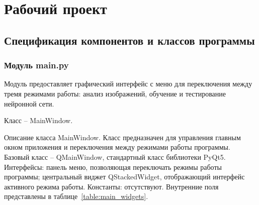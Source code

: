 \section{Рабочий проект}

\subsection{Спецификация компонентов и классов программы}

\subsubsection{Модуль main.py}

Модуль предоставляет графический интерфейс с меню для переключения между тремя режимами работы: анализ изображений, обучение и тестирование нейронной сети. 

Класс -- MainWindow.

Описание класса MainWindow.
Класс предназначен для управления главным окном приложения и переключения между режимами работы программы. Базовый класс -- QMainWindow, стандартный класс библиотеки PyQt5. Интерфейсы: панель меню, позволяющая переключать режимы работы программы; центральный виджет QStackedWidget, отображающий интерфейс активного режима работы. Константы: отсутствуют. Внутренние поля представлены в таблице~\ref{table:main_widgets}.

